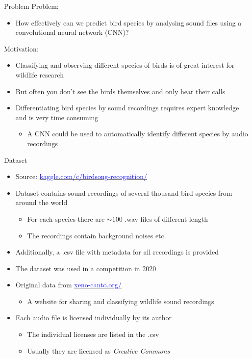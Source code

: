 \begin{frame}{Problem}
  \textcolor{tugreen}{\Large Problem:}
  \begin{itemize}
    \item How effectively can we predict bird species by analysing sound files using a convolutional neural network (CNN)?
  \end{itemize}
  \vspace{3mm}
  \textcolor{tugreen}{\Large Motivation:}
  \begin{itemize}
    \item Classifying and observing different species of birds is of great interest for wildlife research
    \item But often you don't see the birds themselves and only hear their calls
    \item Differentiating bird species by sound recordings requires expert knowledge and is very time consuming
    \begin{itemize}
      \item A CNN could be used to automatically identify different species by audio recordings
    \end{itemize}
  \end{itemize}
\end{frame}

\begin{frame}{Dataset}
  \begin{itemize}
    \item Source: \href{https://www.kaggle.com/c/birdsong-recognition/}{\textcolor{blue}{kaggle.com/c/birdsong-recognition/}}
    \item Dataset contains sound recordings of several thousand bird species from around the world 
    \begin{itemize}
      \item For each species there are $\sim \num{100}$ .wav files of different length
      \item The recordings contain background noises etc. 
    \end{itemize}
    \item Additionally, a .csv file with metadata for all recordings is provided
    \item The dataset was used in a competition in 2020
    \item Original data from \href{https://xeno-canto.org/}{\textcolor{blue}{xeno-canto.org/}}
    \begin{itemize}
      \item A website for sharing and classifying wildlife sound recordings
    \end{itemize}
    \item Each audio file is licensed individually by its author
    \begin{itemize}
      \item The individual licenses are listed in the .csv 
      \item Usually they are licensed as \textit{Creative Commons}
    \end{itemize}
  \end{itemize}
\end{frame}


